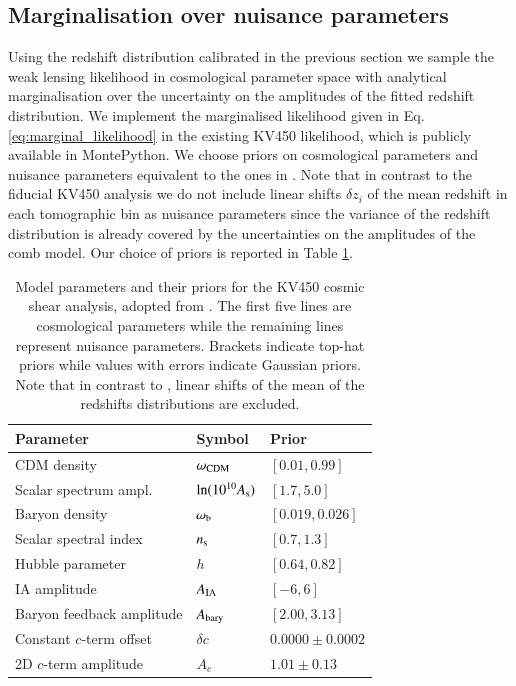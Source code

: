 \documentclass{aa}
\begin{document}
\subsection{Marginalisation over nuisance parameters} 
Using the redshift distribution calibrated in the previous section we sample the weak lensing likelihood in cosmological parameter space with analytical marginalisation over the uncertainty on the amplitudes of the fitted redshift distribution. We implement the marginalised likelihood given in Eq. \ref{eq:marginal_likelihood} in the existing KV450 likelihood, which is publicly available in {\sc MontePython}. We choose priors on cosmological parameters and nuisance parameters equivalent to the ones in \cite{hildebrandt18}. Note that in contrast to the fiducial KV450 analysis we do not include linear shifts $\delta z_i$ of the mean redshift in each tomographic bin as nuisance parameters since the variance of the redshift distribution is already covered by the uncertainties on the amplitudes of the comb model. Our choice of priors is reported in Table \ref{tab:priors}.
\begin{table}
\label{tab:priors}
\begin{tabular}{lll}
\hline
Parameter & Symbol & Prior\\
\hline
CDM density & $\omega_{\rm CDM}$ & $[0.01, 0.99]$\\
Scalar spectrum ampl. & $\ln(10^{10}A_{\rm s})$ & $[1.7, 5.0]$\\
Baryon density & $\omega_{\rm b}$ & $[0.019, 0.026]$ \\
Scalar spectral index & $n_{\rm s}$ & $[0.7, 1.3]$ \\
Hubble parameter & $h$ & $[0.64, 0.82]$ \\
\hline
IA amplitude & $A_{\rm IA}$ & $[-6, 6]$\\
Baryon feedback amplitude & $A_{\rm bary}$ & $[2.00, 3.13]$\\
Constant $c$-term offset & $\delta c$ & $0.0000\pm0.0002$ \\
2D $c$-term amplitude & $A_c$ & $1.01\pm0.13$\\
\hline
\end{tabular}
\caption{Model parameters and their priors for the KV450 cosmic shear analysis, adopted from \cite{hildebrandt18}. The first five lines are cosmological parameters while the remaining lines represent nuisance parameters. Brackets indicate top-hat priors while values with errors indicate Gaussian priors. Note that in contrast to \cite{hildebrandt18}, linear shifts of the mean of the redshifts distributions are excluded.}
\end{table}
\end{document}
